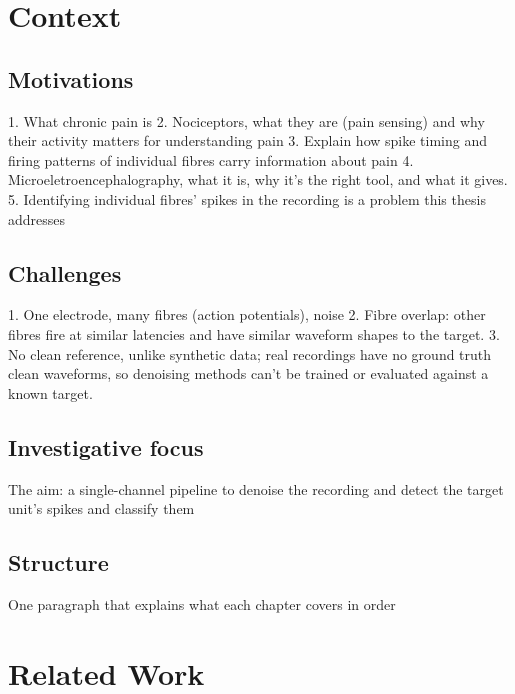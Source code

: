 \documentclass[ %
                    author={Daniel Page},
                supervisor={Dr. Andrew Calway},
                    degree={MSc},
                     title={Some Structural Guidelines for Data Science MSc Theses, Including Those With Long Titles that Run Across Multiple Lines on the Front Page},
                  subtitle={And those including an optional subtitle too, for good measure},
                      type={},
                      year={2021}]{dissertation}
\begin{document}
\frontmatter


\makedecl


\tableofcontents
\chapter{Context}
\section{Motivations}
1. What chronic pain is 
2. Nociceptors, what they are (pain sensing) and why their activity matters for understanding pain
3. Explain how spike timing and firing patterns of individual fibres carry information about pain
4. Microeletroencephalography, what it is, why it's the right tool, and what it gives. 
5. Identifying individual fibres' spikes in the recording is a problem this thesis addresses 
\section{Challenges}
1. One electrode, many fibres (action potentials), noise
2. Fibre overlap: other fibres fire at similar latencies and have similar waveform shapes to the target. 
3. No clean reference, unlike synthetic data; real recordings have no ground truth clean waveforms, so denoising methods can't be trained or evaluated against a known target. 
\section{Investigative focus}
The aim: a single-channel pipeline to denoise the recording and detect the target unit's spikes and classify them
\section{Structure}
One paragraph that explains what each chapter covers in order
\chapter{Related Work}
\end{document}
